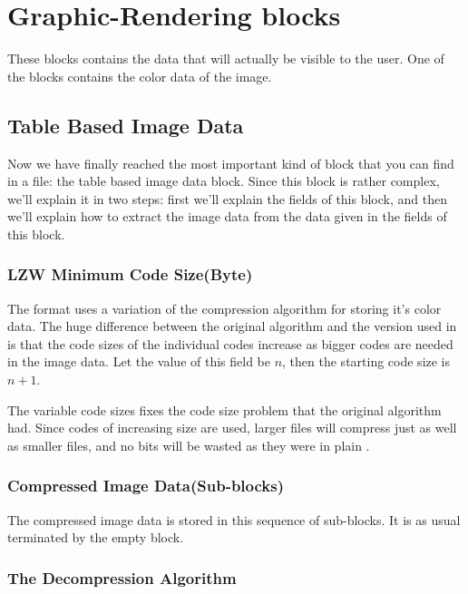 \section{Graphic-Rendering blocks}

These blocks contains the data that will actually be visible to the
user. One of the blocks contains the color data of the image.

\subsection{Table Based Image Data}

Now we have finally reached the most important kind of block that you
can find in a \gif file: the table based image data block. Since this
block is rather complex, we'll explain it in two steps: first we'll
explain the fields of this block, and then we'll explain how to
extract the image data from the data given in the fields of this
block.

\subsubsection{LZW Minimum Code Size(Byte)}

The \gif format uses a variation of the \lzw compression algorithm
for storing it's color data. The huge difference between the
original \lzw algorithm and the version used in \gif is that the
code sizes of the individual codes increase as bigger codes are
needed in the image data.  Let the value of this field be $n$, then
the starting \lzw code size is $n + 1$.

The variable code sizes fixes the code size problem that the original
\lzw algorithm had. Since codes of increasing size are used, larger
files will compress just as well as smaller files, and no bits will be
wasted as they were in plain \lzw.

\subsubsection{Compressed Image Data(Sub-blocks)}

The compressed image data is stored in this sequence of sub-blocks. It
is as usual terminated by the empty block.

\subsubsection{The Decompression Algorithm}

